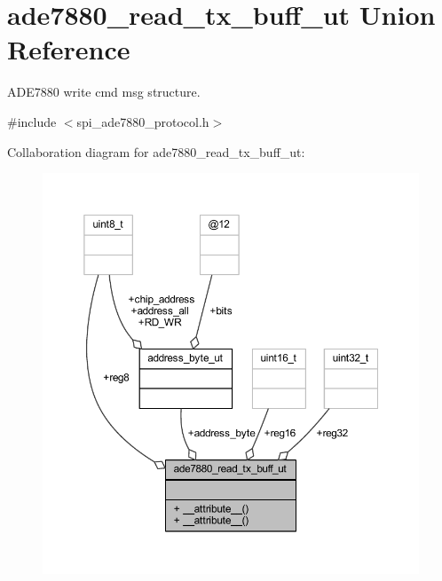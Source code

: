 \hypertarget{a00016}{\section{ade7880\-\_\-read\-\_\-tx\-\_\-buff\-\_\-ut Union Reference}
\label{d7/d7a/a00016}
}


A\-D\-E7880 write cmd msg structure.  




{\ttfamily \#include $<$spi\-\_\-ade7880\-\_\-protocol.\-h$>$}



Collaboration diagram for ade7880\-\_\-read\-\_\-tx\-\_\-buff\-\_\-ut\-:\nopagebreak
\begin{figure}[H]
\begin{center}
\leavevmode
\includegraphics[width=350pt]{d4/d31/a00069}
\end{center}
\end{figure}
